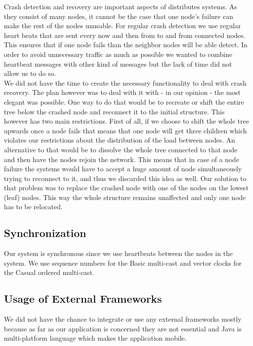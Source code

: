 Crash detection and recovery are important aspects of distributes systems. As they consist of many nodes, it cannot be the case that one node's failure can make the rest of the nodes unusable. For regular crash detection we use regular heart beats that are sent every now and then from to and from connected nodes. This ensures that if one node fails than the neighbor nodes will be able detect. In order to avoid unnecessary traffic as much as possible we wanted to combine heartbeat messages with other kind of messages but the lack of time did not allow us to do so.\\

We did not have the time to create the necessary functionality to deal with crash recovery. The plan however was to deal with it with - in our opinion - the most elegant was possible. One way to do that would be to recreate or shift the entire tree below the crashed node and reconnect it to the initial structure. This however has two main restrictions. First of all, if we choose to shift the whole tree upwards once a node fails that means that one node will get three children which violates our restrictions about the distribution of the load between nodes. An alternative to that would be to dissolve the whole tree connected to that node and then have the nodes rejoin the network. This means that in case of a node failure the systems would have to accept a huge amount of node simultaneously trying to reconnect to it, and thus we discarded this idea as well. Our solution to that problem was to replace the crashed node with one of the nodes on the lowest (leaf) nodes. This way the whole structure remains unaffected and only one node has to be relocated.\\

\subsection{Synchronization}

Our system is synchronous since we use heartbeats between the nodes in the system. We use sequence numbers for the Basic multi-cast and vector clocks for the Casual ordered multi-cast.\\

\subsection{Usage of External Frameworks}

We did not have the chance to integrate or use any external frameworks mostly because as far as our application is concerned they are not essential and Java is multi-platform language which makes the application mobile.\\


